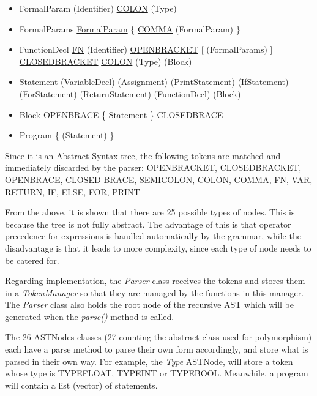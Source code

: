 \begin{itemize}
	\item FormalParam
		\subitem (Identifier) \ul{COLON} (Type)
	\item FormalParams
		\subitem \ul{FormalParam} \{ \ul{COMMA} (FormalParam) \}
	\item FunctionDecl
		\subitem \ul{FN} (Identifier) \ul{OPEN\un BRACKET} [ (FormalParams) ] \ul{CLOSED\un BRACKET} \ul{COLON} (Type) (Block)
	\item Statement
		\subitem (VariableDecl)
		\subitem (Assignment)
		\subitem (PrintStatement)
		\subitem (IfStatement)
		\subitem (ForStatement)
		\subitem (ReturnStatement)
		\subitem (FunctionDecl)
		\subitem (Block)
	\item Block
		\subitem \ul{OPEN\un BRACE} \{ Statement \} \ul{CLOSED\un BRACE}
	\item Program
		\subitem \{ (Statement) \}
\end{itemize}

Since it is an Abstract Syntax tree, the following tokens are matched and immediately discarded by the parser: OPEN\un BRACKET, CLOSED\un BRACKET, OPEN\un BRACE, CLOSED \un BRACE, SEMI\un COLON, COLON, COMMA, FN, VAR, RETURN, IF, ELSE, FOR, PRINT

From the above, it is shown that there are 25 possible types of nodes. This is because the tree is not fully abstract. The advantage of this is that operator precedence for expressions is handled automatically by the grammar, while the disadvantage is that it leads to more complexity, since each type of node needs to be catered for.

Regarding implementation, the \textit{Parser} class receives the tokens and stores them in a \textit{TokenManager} so that they are managed by the functions in this manager. The \textit{Parser} class also holds the root node of the recursive AST which will be generated when the \textit{parse()} method is called.

The 26 ASTNodes classes (27 counting the abstract class used for polymorphism) each have a parse method to parse their own form accordingly, and store what is parsed in their own way. For example, the \textit{Type} ASTNode, will store a token whose type is TYPE\un FLOAT, TYPE\un INT or TYPE\un BOOL. Meanwhile, a program will contain a list (vector) of statements.

